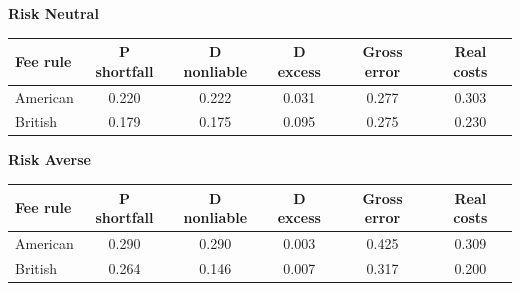 \documentclass[10pt,border=5pt,varwidth=17cm]{standalone}
\begin{document}
\begingroup
\small
\setlength{\tabcolsep}{5pt}
\renewcommand{\arraystretch}{1.20}
\noindent\textbf{Risk Neutral}\par\smallskip
\noindent\begin{tabularx}{\linewidth}{@{}>{\raggedright\arraybackslash}Xccccc@{}}
\toprule
\textbf{Fee rule} & \textbf{P shortfall} & \textbf{D nonliable} & \textbf{D excess} & \textbf{Gross error} & \textbf{Real costs} \\
\midrule
American & 0.220 & 0.222 & 0.031 & 0.277 & 0.303 \\
British & 0.179 & 0.175 & 0.095 & 0.275 & 0.230 \\
\bottomrule\end{tabularx}\par\medskip
\noindent\textbf{Risk Averse}\par\smallskip
\noindent\begin{tabularx}{\linewidth}{@{}>{\raggedright\arraybackslash}Xccccc@{}}
\toprule
\textbf{Fee rule} & \textbf{P shortfall} & \textbf{D nonliable} & \textbf{D excess} & \textbf{Gross error} & \textbf{Real costs} \\
\midrule
American & 0.290 & 0.290 & 0.003 & 0.425 & 0.309 \\
British & 0.264 & 0.146 & 0.007 & 0.317 & 0.200 \\
\bottomrule\end{tabularx}\par\medskip
\endgroup
\end{document}
